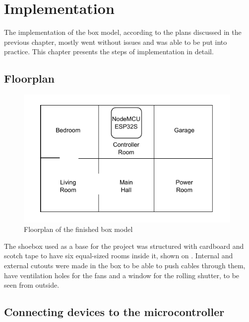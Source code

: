 \chapter{Implementation}

The implementation of the box model, according to the plans discussed in the previous chapter, mostly went without issues and was able to be put into practice. This chapter presents the steps of implementation in detail.

\section{Floorplan}

\begin{figure}[!ht]
    \centering
    \includegraphics[page=1,keepaspectratio,width=110mm]{figures/box_floorplan.drawio.pdf}
    \caption{Floorplan of the finished box model}
    \label{fig:BoxFloorplan}
\end{figure}

The shoebox used as a base for the project was structured with cardboard and scotch tape to have six equal-sized rooms inside it, shown on . Internal and external cutouts were made in the box to be able to push cables through them, have ventilation holes for the fans and a window for the rolling shutter, to be seen from outside.

\section{Connecting devices to the microcontroller}

